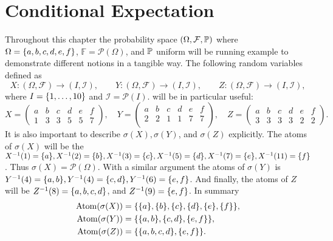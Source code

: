 \chapter{Conditional Expectation}


\begin{example}
	\label{exp:Running1}
	Throughout this chapter the probability space $ (\Omega,\mathcal{F},\mathbb{P}) $ where $ \Omega = \{a,b,c,d,e,f\} $, $ \mathbb{F} = \mathcal{P}(\Omega) $, and $ \mathbb{P} $ uniform will be running example to demonstrate different notions in a tangible way. The following random variables defined as
	\[ X: (\Omega,\mathcal{F})\to (I,\mathcal{I}),\qquad  Y: (\Omega,\mathcal{F})\to (I,\mathcal{I}),\qquad  Z: (\Omega,\mathcal{F})\to (I,\mathcal{I}), \]
	where $ I = \{1,\dots,10\} $ and $ \mathcal{I}=\mathcal{P}(I) $. will be in particular useful:
	\[ X = \begin{pmatrix}
		a & b & c & d & e & f \\
		1 & 3 & 3 & 5 & 5 & 7
	\end{pmatrix}, \quad
	Y = \begin{pmatrix}
		a & b & c & d & e & f \\
		2 & 2 & 1 & 1 & 7 & 7 \\
	\end{pmatrix},\quad
	Z = \begin{pmatrix}
		a & b & c & d & e & f \\
		3 & 3 & 3 & 3 & 2 & 2
	\end{pmatrix}.
	\]
	It is also important to describe $ \sigma(X), \sigma(Y) $, and $ \sigma(Z) $ explicitly. The atoms of $ \sigma(X) $ will be the $ X^{-1}(1)=\{a\},X^{-1}(2)=\{b\},X^{-1}(3)=\{c\},X^{-1}(5)=\{d\}, X^{-1}(7)=\{e\},X^{-1}(11)=\{f\} $. Thus $ \sigma(X) = \mathcal{P}(\Omega) $. With a similar argument the atoms of $ \sigma(Y) $ is $ Y^{-1}(4) = \{a,b\}, Y^{-1}(4)=\{c,d\}, Y^{-1}(6) = \{e,f\} $. And finally, the atoms of $ Z $ will be $ Z^{-1}(8) = \{a,b,c,d\} $, and $ Z^{-1}(9) = \{e,f\} $. In summary
	\begin{align*}
		\operatorname{Atom}(\sigma(X)) &= \{\{a\},\{b\},\{c\},\{d\},\{e\},\{f\}\}, \\
		\operatorname{Atom}(\sigma(Y)) &= \{\{a,b\},\{c,d\},\{e,f\}\}, \\
		\operatorname{Atom}(\sigma(Z)) &= \{\{a,b,c,d\},\{e,f\}\}.
	\end{align*}
\end{example}

